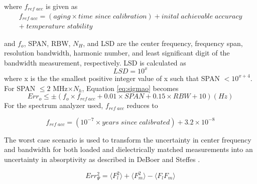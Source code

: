 \noindent where $f_{ref\;acc}$ is given as
\begin{equation}\label{eq:frefacclong}
\begin{split}
f_{ref\;acc} = (aging \times {time\;since\;calibration}) + {inital\;achievable\;accuracy} \\
+ {\;temperature\;stability}
\end{split}
\end{equation}

\noindent and $f_o$, SPAN, RBW, $N_H$, and LSD are the center frequency, frequency span, resolution bandwidth, harmonic number, and least significant digit of the bandwidth measurement, respectively. LSD is calculated as 
\begin{equation}
LSD = 10^x
\end{equation} 
where x is the the smallest positive integer value of x such that SPAN $< 10^{x+4}$. For SPAN $\leq 2$ MHz$\times N_h$, Equation \ref{eq:sigmao} becomes 
\begin{equation}\label{eq:sigmaosmall}
Err_o \leq \pm (f_o \times f_{ref\:acc} + 0.01 \times SPAN + 0.15 \times RBW +10 ) (Hz)
\end{equation}
For the spectrum analyzer used, $f_{ref\;acc}$ reduces to

\begin{equation}\label{eq:frefacc}
f_{ref\;acc} = (10^{-7} \times {years\;since\;calibrated}) + 3.2\times 10^{-8}
\end{equation}

The worst case scenario is used to transform the uncertainty in center frequency and bandwidth for both loaded and dielectrically matched measurements into an uncertainty in absorptivity as described in DeBoer and Steffes \cite{DeBoer-Steffes}.

\begin{equation}
Err^2_\Psi = \langle {F_l^2}\rangle + \langle {F_m^2}\rangle -\langle {F_l F_m}\rangle
\end{equation}

